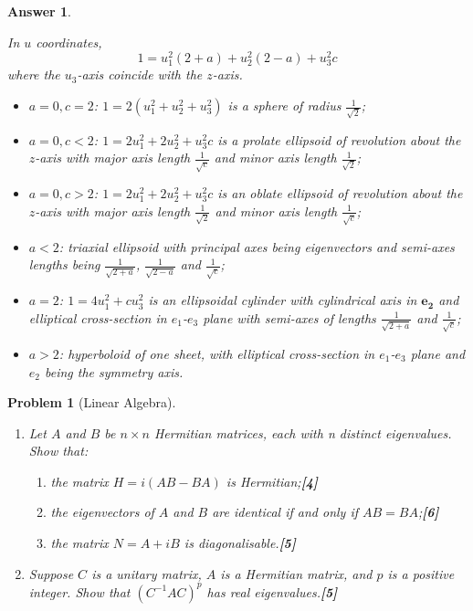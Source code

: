 \documentclass[a4paper]{article}
\newtheorem{ans}{Answer}[section]
\theoremstyle{new}
\newtheorem{qns}{Problem}[section]
\begin{document}
\begin{ans}
\begin{enumerate}[label=(\alph*)]
In $u$ coordinates, $$1=u_1^2(2+a)+u_2^2(2-a)+u_3^2c$$
where the $u_3$-axis coincide with the $z$-axis.
\begin{itemize}
    \item $a=0,c=2$: $1=2(u_1^2+u_2^2+u_3^2)$ is a sphere of radius $\frac{1}{\sqrt{2}}$;
    \item $a=0,c<2$: $1=2u_1^2+2u_2^2+u_3^2c$ is a prolate ellipsoid of revolution about the $z$-axis with major axis length $\frac{1}{\sqrt{c}}$ and minor axis length $\frac{1}{\sqrt{2}}$;
    \item $a=0,c>2$: $1=2u_1^2+2u_2^2+u_3^2c$ is an oblate ellipsoid of revolution about the $z$-axis with major axis length $\frac{1}{\sqrt{2}}$ and minor axis length $\frac{1}{\sqrt{c}}$;
    \item $a<2$: triaxial ellipsoid with principal axes being eigenvectors and semi-axes lengths being $\frac{1}{\sqrt{2+a}}$, $\frac{1}{\sqrt{2-a}}$ and $\frac{1}{\sqrt{c}}$;
    \item $a=2$: $1=4u_1^2+cu_3^2$ is an ellipsoidal cylinder with cylindrical axis in $\mathbf{e_2}$ and elliptical cross-section in $e_1$-$e_3$ plane with semi-axes of lengths $\frac{1}{\sqrt{2+a}}$ and $\frac{1}{\sqrt{c}}$;
    \item $a>2$: hyperboloid of one sheet, with elliptical cross-section in $e_1$-$e_3$ plane and $e_2$ being the symmetry axis.
\end{itemize}
\end{enumerate}
\end{ans}
\newpage
\begin{qns}[Linear Algebra]\leavevmode
\begin{enumerate}[label=(\alph*)]
\item Let $A$ and $B$ be $n\times n$ Hermitian matrices, each with n distinct eigenvalues. Show that:
\begin{enumerate}[label=(\roman*)]
\item the matrix $H = i(AB − BA)$ is Hermitian;\hfill\textbf{[4]}
\item the eigenvectors of $A$ and $B$ are identical if and only if $AB = BA$;\hfill\textbf{[6]}
\item the matrix $N = A + iB$ is diagonalisable.\hfill\textbf{[5]}
\end{enumerate}
\item Suppose $C$ is a unitary matrix, $A$ is a Hermitian matrix, and $p$ is a positive integer. Show that $(C^{−1}AC)^p$ has real eigenvalues.\hfill\textbf{[5]}
\end{enumerate}
\end{qns}
\end{document}
